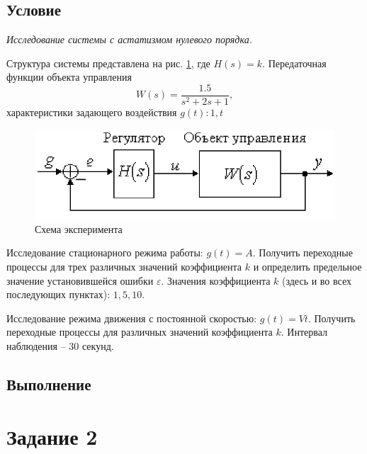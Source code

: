 \documentclass[a4paper, 12pt]{article}
\begin{document}
    \subsection{Условие}
    \textit{Исследование системы с астатизмом нулевого порядка.}
    \begin{compactitem}
        \item Структура системы представлена на рис. \ref{fig:struct_scheme1}, где $H(s)=k$. Передаточная функции объекта
        управления $$W(s)=\dfrac{1.5}{s^2+2s+1},$$ характеристики задающего воздействия $g(t):1,t$
        \begin{figure}[H]
            \centering
            \includegraphics[scale=0.7]{struct_scheme1.png}
            \captionsetup{skip=0pt}
            \caption{Схема эксперимента}
            \label{fig:struct_scheme1}
        \end{figure}
        \item Исследование стационарного режима работы: $g(t)=A$.
        Получить переходные процессы для трех различных значений
        коэффициента $k$ и определить предельное
        значение установившейся ошибки $\varepsilon$.
        Значения коэффициента $k$ (здесь и во
        всех последующих пунктах): $1, 5, 10$.
        \item Исследование режима движения
        с постоянной скоростью: $g(t)=Vt$.
        Получить переходные процессы для различных
        значений коэффициента $k$. Интервал наблюдения --
        $30$ секунд.
    \end{compactitem}
     

    \subsection{Выполнение}


    \section{Задание 2}
\end{document}
